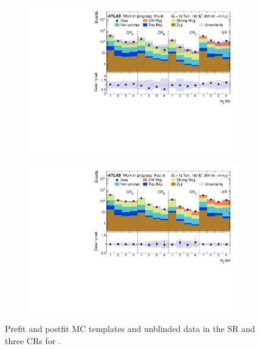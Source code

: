 \begin{figure}[H]
\centering
\begin{subfigure}[b]{\textwidth}
    \centering
    \includegraphics[width=\textwidth]{plots/diffx/stacks/preFit_stack_mjj_WIP_12Feb.pdf}
    \caption{}
\end{subfigure}
\hfill
\begin{subfigure}[b]{\textwidth}
    \centering
    \includegraphics[width=\textwidth]{plots/diffx/stacks/postFit_stack_mjj_WIP_12Feb.pdf}
    \caption{}
\end{subfigure}
\caption{Prefit and postfit MC templates and unblinded data in the SR and three CRs for \mjj.}
\label{fig:mjj_templates}
\end{figure}

